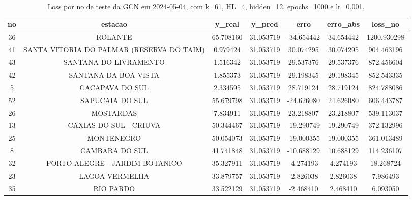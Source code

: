 \begin{table}[h]
\centering
\caption{Loss por no de teste da GCN em 2024-05-04, com k=61, HL=4, hidden=12, epochs=1000 e lr=0.001.}
\label{tab:gcn_loss_k61_hl4_h12_e1000_d20240504}
\begin{tabular}{ccccccc}
\toprule
no & estacao & y\_real & y\_pred & erro & erro\_abs & loss\_no \\
\midrule
36 & ROLANTE & 65.708160 & 31.053719 & -34.654442 & 34.654442 & 1200.930298 \\
41 & SANTA VITORIA DO PALMAR (RESERVA DO TAIM) & 0.979424 & 31.053719 & 30.074295 & 30.074295 & 904.463196 \\
43 & SANTANA DO LIVRAMENTO & 1.516342 & 31.053719 & 29.537376 & 29.537376 & 872.456604 \\
42 & SANTANA DA BOA VISTA & 1.855373 & 31.053719 & 29.198345 & 29.198345 & 852.543335 \\
5 & CACAPAVA DO SUL & 2.334595 & 31.053719 & 28.719124 & 28.719124 & 824.788086 \\
52 & SAPUCAIA DO SUL & 55.679798 & 31.053719 & -24.626080 & 24.626080 & 606.443787 \\
26 & MOSTARDAS & 7.834911 & 31.053719 & 23.218807 & 23.218807 & 539.113037 \\
13 & CAXIAS DO SUL - CRIUVA & 50.344467 & 31.053719 & -19.290749 & 19.290749 & 372.132996 \\
25 & MONTENEGRO & 50.054073 & 31.053719 & -19.000355 & 19.000355 & 361.013489 \\
8 & CAMBARA DO SUL & 41.741848 & 31.053719 & -10.688129 & 10.688129 & 114.236107 \\
32 & PORTO ALEGRE - JARDIM BOTANICO & 35.327911 & 31.053719 & -4.274193 & 4.274193 & 18.268724 \\
23 & LAGOA VERMELHA & 33.879757 & 31.053719 & -2.826038 & 2.826038 & 7.986493 \\
35 & RIO PARDO & 33.522129 & 31.053719 & -2.468410 & 2.468410 & 6.093050 \\
\bottomrule
\end{tabular}
\end{table}
